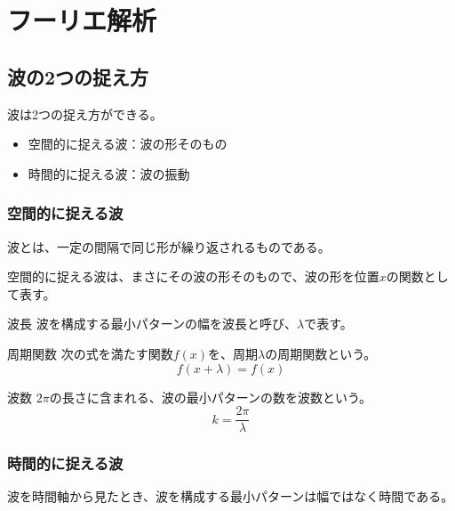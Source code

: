 \documentclass[../imaging-math]{subfiles}
\begin{document}
\chapter{フーリエ解析}

\section{波の2つの捉え方}

波は2つの捉え方ができる。

\begin{itemize}
  \item 空間的に捉える波：波の形そのもの
  \item 時間的に捉える波：波の振動
\end{itemize}

\subsection{空間的に捉える波}

波とは、一定の間隔で同じ形が繰り返されるものである。

空間的に捉える波は、まさにその波の形そのもので、波の形を位置$x$の関数として表す。

\begin{definition}{波長}
  波を構成する最小パターンの幅を波長と呼び、$\lambda$で表す。
\end{definition}

\begin{definition}{周期関数}
  次の式を満たす関数$f(x)$を、周期$\lambda$の周期関数という。
  \LARGE
  \begin{equation}
    f(x+\lambda) = f(x)
  \end{equation}
\end{definition}

\begin{definition}{波数}
  $2\pi$の長さに含まれる、波の最小パターンの数を波数という。
  \LARGE
  \begin{equation}
    k = \dfrac{2\pi}{\lambda}
  \end{equation}
\end{definition}

\subsection{時間的に捉える波}

波を時間軸から見たとき、波を構成する最小パターンは幅ではなく時間である。
\end{document}
